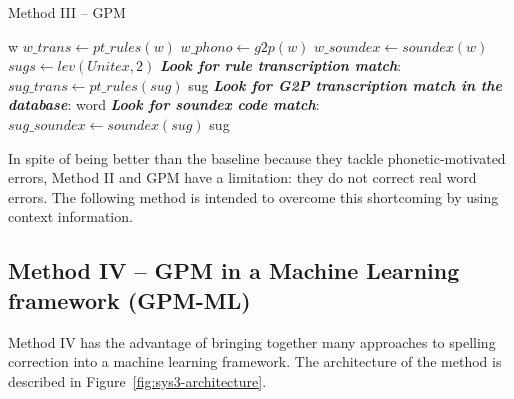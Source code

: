 \begin{algorithm}
\scriptsize
\caption{Method III -- GPM}\label{alg:pseudocode-method3}
\begin{algorithmic}[1]
\State \Return w
\Else
\State $w\_trans \gets pt\_rules(w)$ 
\State $w\_phono \gets g2p(w)$ 
\State $w\_soundex \gets soundex(w)$ 
\State $sugs \gets lev(Unitex,2)$ 
\State \emph{\textbf{Look for rule transcription match}}:
\State $sug\_trans \gets pt\_rules(sug)$
\State \Return sug
\EndIf
\EndFor
\State \emph{\textbf{Look for G2P transcription match in the database}}:
\State \Return word
\EndIf
\State \emph{\textbf{Look for soundex code match}}:
\State $sug\_soundex \gets soundex(sug)$
\State \Return sug
\EndIf
\EndFor    
\State {} 
\EndIf
\EndProcedure
\end{algorithmic}
\end{algorithm}

In spite of being better than the baseline because they tackle phonetic-motivated errors, Method II and GPM have a limitation: they do not correct real word errors. The following method is intended to overcome this shortcoming by using context information.

\subsection{Method IV -- GPM in a Machine Learning framework (GPM-ML)}

Method IV has the advantage of bringing together many approaches to spelling correction into a machine learning framework. The architecture of the method is described in Figure~\ref{fig:sys3-architecture}. 

